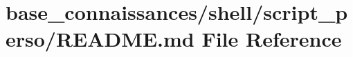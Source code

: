 \hypertarget{base__connaissances_2shell_2script__perso_2README_8md}{}\section{base\+\_\+connaissances/shell/script\+\_\+perso/\+R\+E\+A\+D\+ME.md File Reference}
\label{base__connaissances_2shell_2script__perso_2README_8md}
